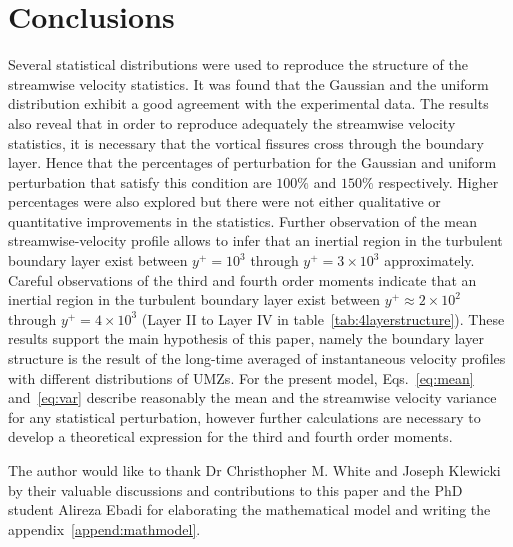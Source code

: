 \documentclass[aps,reprint,amsmath,amssymb,pra]{revtex4-1}%
\begin{document}
\section{Conclusions}
Several statistical distributions were used to reproduce the structure of the streamwise velocity statistics. It was found that the Gaussian and the uniform distribution exhibit a good agreement with the experimental data. The results also reveal that in order to reproduce adequately the streamwise velocity statistics, it is necessary that the vortical fissures cross through the boundary layer. Hence that the percentages of perturbation for the Gaussian and uniform perturbation that satisfy this condition are $100\%$ and $150\%$ respectively. Higher percentages were also explored but there were not either qualitative or quantitative improvements in the statistics. Further observation of the mean streamwise-velocity profile allows to infer that an inertial region in the turbulent boundary layer exist between $y^+=10^3$ through $y^+=3\times 10^3$ approximately. Careful observations of the third and fourth order moments  indicate that an inertial region in the turbulent boundary layer exist between $y^+\approx 2\times10^2$ through $y^+=4\times 10^3$  (Layer II to Layer IV in table~\ref{tab:4layerstructure}). These results support the main hypothesis of this paper, namely the boundary layer structure is the result of the long-time averaged of instantaneous velocity profiles with different distributions of UMZs. For the present model, Eqs.~\ref{eq:mean} and~\ref{eq:var} describe reasonably the mean and the streamwise velocity variance for any statistical perturbation, however further calculations are necessary to develop a theoretical expression for the third and fourth order moments. 

\begin{acknowledgments}
The author would like to thank Dr Christhopher M. White and Joseph Klewicki by their valuable discussions and contributions to this paper and the PhD student Alireza Ebadi for elaborating the mathematical model and writing the appendix~\ref{append:mathmodel}.\\
\end{acknowledgments}

\appendix
\end{document}
